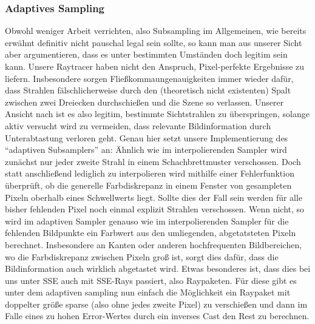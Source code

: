 \subsubsection{Adaptives Sampling}
Obwohl weniger Arbeit verrichten, also Subsampling im Allgemeinen, wie bereits erwähnt definitiv nicht pauschal legal sein sollte, so kann man aus unserer Sicht aber argumentieren, dass es unter bestimmten Umständen doch legitim sein kann.
Unsere Raytracer haben nicht den Anspruch, Pixel-perfekte Ergebnisse zu liefern.
Insbesondere sorgen Fließkommaungenauigkeiten immer wieder dafür, dass Strahlen fälschlicherweise durch den (theoretisch nicht existenten) Spalt zwischen zwei Dreiecken durchschießen und die Szene so verlassen.
Unserer Ansicht nach ist es also legitim, bestimmte Sichtstrahlen zu überspringen, solange aktiv versucht wird zu vermeiden, dass relevante Bildinformation durch Unterabtastung verloren geht.
Genau hier setzt unsere Implementierung des "`adaptiven Subsamplers"' an:
Ähnlich wie im interpolierenden Sampler wird zunächst nur jeder zweite Strahl in einem Schachbrettmuster verschossen.
Doch statt anschließend lediglich zu interpolieren wird mithilfe einer Fehlerfunktion überprüft, ob die generelle Farbdiskrepanz in einem Fenster von gesampleten Pixeln oberhalb eines Schwellwerts liegt.
Sollte dies der Fall sein werden für alle bisher fehlenden Pixel noch einmal explizit Strahlen verschossen.
Wenn nicht, so wird im adaptiven Sampler genauso wie im interpolierenden Sampler für die fehlenden Bildpunkte ein Farbwert aus den umliegenden, abgetatsteten Pixeln berechnet.
Insbesondere an Kanten oder anderen hochfrequenten Bildbereichen, wo die Farbdiskrepanz zwischen Pixeln groß ist, sorgt dies dafür, dass die Bildinformation auch wirklich abgetastet wird.
Etwas besonderes ist, dass dies bei uns unter SSE auch mit SSE-Rays passiert, also Raypaketen.
Für diese gibt es unter dem adaptiven sampling nun einfach die Möglichkeit ein Raypaket mit doppelter größe sparse (also ohne jedes zweite Pixel) zu verschießen und dann im Falle eines zu hohen Error-Wertes durch ein inverses Cast den Rest zu berechnen.
